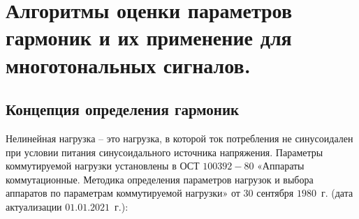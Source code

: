 
%




%
\chapter{ Алгоритмы оценки параметров гармоник и их применение для многотональных сигналов.}\label{ch:ch1}

\section{Концепция определения гармоник} \label{sec:ch1/sec1}

Нелинейная нагрузка – это нагрузка, в которой ток потребления не синусоидален при условии питания синусоидального источника напряжения.
Параметры коммутируемой нагрузки установлены в ОСТ $1 00392 - 80$  «Аппараты коммутационные. Методика определения параметров нагрузок и выбора аппаратов по параметрам коммутируемой нагрузки» от $30$   сентября $1980$~г. (дата актуализации  $01.01.2021$~г.):

